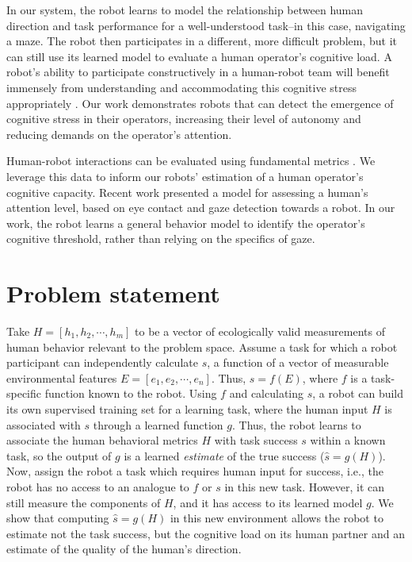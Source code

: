 \documentclass{sig-alternate}
\begin{document}
In our system, the robot learns to model the relationship between
human direction and task performance for a well-understood task--in
this case, navigating a maze. The robot then participates in a
different, more difficult problem, but it can still use its learned
model to evaluate a human operator's cognitive load.  A robot's
ability to participate constructively in a human-robot team will
benefit immensely from understanding and accommodating this cognitive
stress appropriately \cite{crandall2005validating}. Our work
demonstrates robots that can detect the emergence of cognitive stress
in their operators, increasing their level of autonomy and reducing
demands on the operator's attention.

Human-robot interactions can be evaluated using fundamental metrics
\cite{olsen2003metrics}.  We leverage this data to inform our robots'
estimation of a human operator's cognitive capacity.  Recent work
\cite{das2013attention,Hoque:2012:ACH:2157689.2157729} presented a
model for assessing a human's attention level, based on eye contact
and gaze detection towards a robot.  In our work, the robot learns a
general behavior model to identify the operator's cognitive threshold,
rather than relying on the specifics of gaze.


\section{Problem statement}
Take $H=[h_1,h_2,\cdots,h_m]$ to be a vector of ecologically valid
measurements of human behavior relevant to the problem space.  Assume
a task for which a robot participant can independently calculate $s$,
a function of a vector of measurable environmental features
$E=[e_1,e_2,\cdots,e_n]$.  Thus, $s = f(E)$, where $f$ is a
task-specific function known to the robot.  Using $f$ and calculating
$s$, a robot can build its own supervised training set for a learning
task, where the human input $H$ is associated with $s$ through a
learned function $g$.  Thus, the robot learns to associate the human
behavioral metrics $H$ with task success $s$ within a known task, so
the output of $g$ is a learned \emph{estimate} of the true success
($\hat{s}=g(H)$).  Now, assign the robot a task which requires human
input for success, i.e., the robot has no access to an analogue to $f$
or $s$ in this new task.  However, it can still measure the components
of $H$, and it has access to its learned model $g$.  We show that
computing $\hat{s}=g(H)$ in this new environment allows the robot to
estimate not the task success, but the cognitive load on its human
partner and an estimate of the quality of the human's direction.
\end{document}
